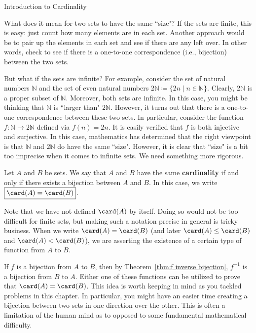 \begin{section}{Introduction to Cardinality}

What does it mean for two sets to have the same ``size"?  If the sets are finite, this is easy: just count how many elements are in each set.  Another approach would be to pair up the elements in each set and see if there are any left over.  In other words, check to see if there is a one-to-one correspondence (i.e., bijection) between the two sets.  

But what if the sets are infinite?  For example, consider the set of natural numbers $\mathbb{N}$ and the set of even natural numbers $2\mathbb{N}\coloneqq \{2n\mid n\in \mathbb{N}\}$. Clearly, $2\mathbb{N}$ is a proper subset of $\mathbb{N}$.  Moreover, both sets are infinite.  In this case, you might be thinking that $\mathbb{N}$ is ``larger than" $2\mathbb{N}$.  However, it turns out that there is a one-to-one correspondence between these two sets.  In particular, consider the function $f:\mathbb{N}\to 2\mathbb{N}$ defined via $f(n)=2n$.  It is easily verified that $f$ is both injective and surjective.  In this case, mathematics has determined that the right viewpoint is that $\mathbb{N}$ and $2\mathbb{N}$ do have the same ``size". However, it is clear that ``size" is a bit too imprecise when it comes to infinite sets. We need something more rigorous.

\begin{definition}
Let $A$ and $B$ be sets. We say that $A$ and $B$ have the same \textbf{cardinality} if and only if there exists a bijection between $A$ and $B$. In this case, we write $\boxed{\card(A)=\card(B)}$.
\end{definition}

Note that we have not defined $\card(A)$ by itself. Doing so would not be too difficult for finite sets, but making such a notation precise in general is tricky business.  When we write $\card(A)=\card(B)$ (and later $\card(A)\leq \card(B)$ and $\card(A)<\card(B)$), we are asserting the existence of a certain type of function from $A$ to $B$.

If $f$ is a bijection from $A$ to $B$, then by Theorem~\ref{thm:f inverse bijection}, $f^{-1}$ is a bijection from $B$ to $A$.  Either one of these functions can be utilized to prove that $\card(A)=\card(B)$.  This idea is worth keeping in mind as you tackled problems in this chapter.  In particular, you might have an easier time creating a bijection between two sets in one direction over the other. This is often a limitation of the human mind as to opposed to some fundamental mathematical difficulty.


\end{section}
